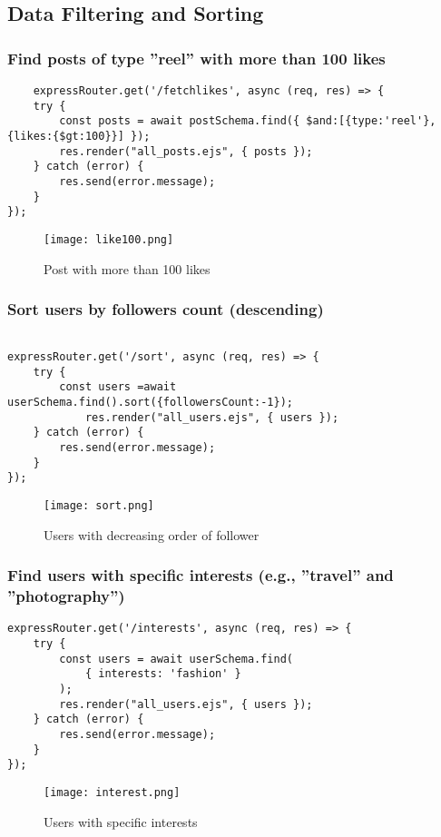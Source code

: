 \documentclass[12pt,a4paper]{article}
\begin{document}
\subsection{Data Filtering and Sorting}
\subsubsection{Find posts of type ”reel” with more than 100 likes}
\begin{lstlisting}
    expressRouter.get('/fetchlikes', async (req, res) => {
    try {
        const posts = await postSchema.find({ $and:[{type:'reel'},{likes:{$gt:100}}] });
        res.render("all_posts.ejs", { posts });
    } catch (error) {
        res.send(error.message);
    }
});
\end{lstlisting}
    \begin{figure}[H]
    \centering
    \texttt{[image: like100.png]}
    \caption{Post with more than 100 likes}
    \label{fig:sample}
\end{figure}

\subsubsection{Sort users by followers count (descending)}
\begin{lstlisting}
    
expressRouter.get('/sort', async (req, res) => {
    try {
        const users =await userSchema.find().sort({followersCount:-1});
            res.render("all_users.ejs", { users });
    } catch (error) {
        res.send(error.message);
    }
});

\end{lstlisting}
    \begin{figure}[H]
    \centering
    \texttt{[image: sort.png]}
    \caption{Users with decreasing order of follower}
    \label{fig:sample}
\end{figure}


\vspace{10in}
\subsubsection{Find users with specific interests (e.g., ”travel” and ”photography”)}
\begin{lstlisting}
expressRouter.get('/interests', async (req, res) => {
    try {
        const users = await userSchema.find(
            { interests: 'fashion' }
        );
        res.render("all_users.ejs", { users });
    } catch (error) {
        res.send(error.message);
    }
});

\end{lstlisting}
    \begin{figure}[H]
    \centering
    \texttt{[image: interest.png]}
    \caption{Users with specific interests}
    \label{fig:sample}
\end{figure}
\end{document}
